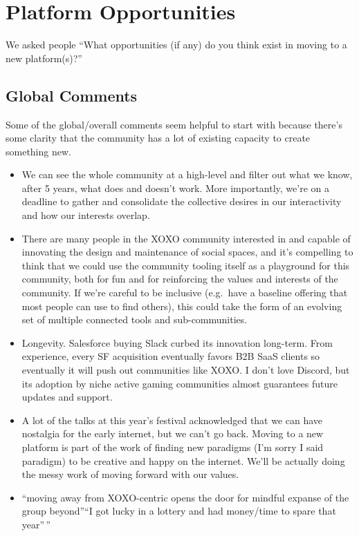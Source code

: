 \documentclass[
]{book}
\providecommand{\tightlist}{%
  \setlength{\itemsep}{0pt}\setlength{\parskip}{0pt}}
\begin{document}
\chapter{Platform Opportunities}\label{platform-opportunities}

We asked people ``What opportunities (if any) do you think exist in moving to a new platform(s)?''

\section{Global Comments}\label{global-comments}

Some of the global/overall comments seem helpful to start with because there's some clarity that the community has a lot of existing capacity to create something new.

\begin{itemize}
\tightlist
\item
  We can see the whole community at a high-level and filter out what we know, after 5 years, what does and doesn't work. More importantly, we're on a deadline to gather and consolidate the collective desires in our interactivity and how our interests overlap.
\item
  There are many people in the XOXO community interested in and capable of innovating the design and maintenance of social spaces, and it's compelling to think that we could use the community tooling itself as a playground for this community, both for fun and for reinforcing the values and interests of the community. If we're careful to be inclusive (e.g.~have a baseline offering that most people can use to find others), this could take the form of an evolving set of multiple connected tools and sub-communities.
\item
  Longevity. Salesforce buying Slack curbed its innovation long-term. From experience, every SF acquisition eventually favors B2B SaaS clients so eventually it will push out communities like XOXO. I don't love Discord, but its adoption by niche active gaming communities almost guarantees future updates and support.
\item
  A lot of the talks at this year's festival acknowledged that we can have nostalgia for the early internet, but we can't go back. Moving to a new platform is part of the work of finding new paradigms (I'm sorry I said paradigm) to be creative and happy on the internet. We'll be actually doing the messy work of moving forward with our values.
\item
  ``moving away from XOXO-centric opens the door for mindful expanse of the group beyond''``I got lucky in a lottery and had money/time to spare that year''\,''

\end{itemize}
\end{document}
